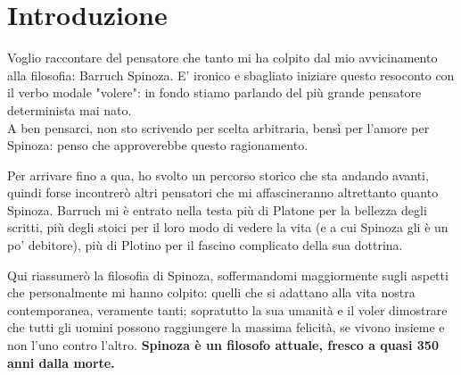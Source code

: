
\chapter*{Introduzione}

Voglio raccontare del pensatore che tanto mi ha colpito dal mio avvicinamento alla filosofia: Barruch Spinoza. E' ironico e sbagliato iniziare questo resoconto con il verbo modale "volere": in fondo stiamo parlando del più grande pensatore determinista mai nato.\\
A ben pensarci, non sto scrivendo per scelta arbitraria, bensì per l'amore per Spinoza: penso che approverebbe questo ragionamento.

Per arrivare fino a qua, ho svolto un percorso storico che sta andando avanti, quindi forse incontrerò  altri pensatori che mi affascineranno altrettanto quanto Spinoza. Barruch mi è entrato nella testa più di Platone per la bellezza degli scritti, più degli stoici per il loro modo di vedere la vita (e a cui Spinoza gli è un po' debitore), più di Plotino per il fascino complicato della sua dottrina.

Qui riassumerò la filosofia di Spinoza, soffermandomi maggiormente sugli aspetti che  personalmente mi hanno colpito: quelli che si adattano alla vita nostra contemporanea, veramente tanti; sopratutto la sua umanità e il voler dimostrare che tutti gli uomini possono raggiungere la massima felicità, se vivono insieme e non l'uno contro l'altro. \textbf{Spinoza è un filosofo attuale, fresco a quasi 350 anni dalla morte.}
\newpage